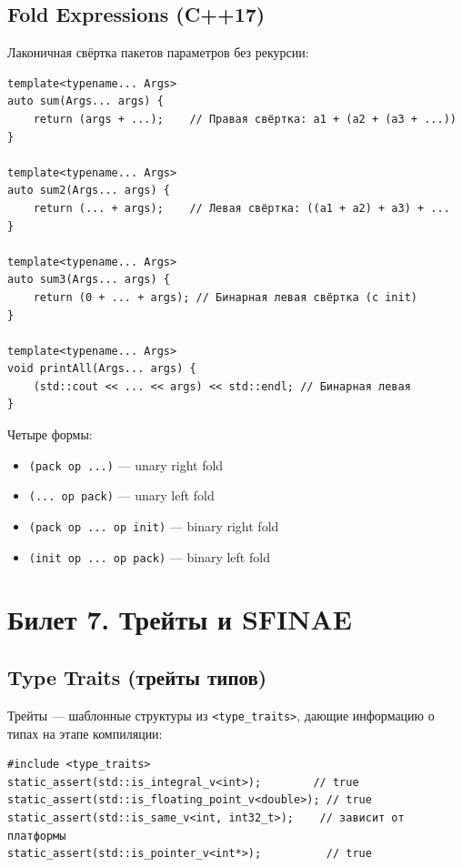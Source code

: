 \documentclass[12pt,a4paper]{article}
\begin{document}
\subsection{Fold Expressions (C++17)}

Лаконичная свёртка пакетов параметров без рекурсии:
\begin{lstlisting}
template<typename... Args>
auto sum(Args... args) {
    return (args + ...);    // Правая свёртка: a1 + (a2 + (a3 + ...))
}

template<typename... Args>
auto sum2(Args... args) {
    return (... + args);    // Левая свёртка: ((a1 + a2) + a3) + ...
}

template<typename... Args>
auto sum3(Args... args) {
    return (0 + ... + args); // Бинарная левая свёртка (с init)
}

template<typename... Args>
void printAll(Args... args) {
    (std::cout << ... << args) << std::endl; // Бинарная левая
}
\end{lstlisting}

Четыре формы:
\begin{itemize}
    \item \texttt{(pack op ...)} --- unary right fold
    \item \texttt{(... op pack)} --- unary left fold
    \item \texttt{(pack op ... op init)} --- binary right fold
    \item \texttt{(init op ... op pack)} --- binary left fold
\end{itemize}

\section{Билет 7. Трейты и SFINAE}

\subsection{Type Traits (трейты типов)}

Трейты --- шаблонные структуры из \texttt{<type\_traits>}, дающие информацию о типах на этапе компиляции:

\begin{lstlisting}
#include <type_traits>
static_assert(std::is_integral_v<int>);        // true
static_assert(std::is_floating_point_v<double>); // true
static_assert(std::is_same_v<int, int32_t>);    // зависит от платформы
static_assert(std::is_pointer_v<int*>);          // true
\end{lstlisting}
\end{document}
